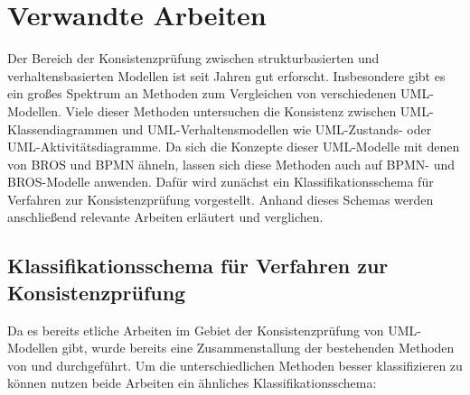 \chapter{Verwandte Arbeiten}

Der Bereich der Konsistenzprüfung zwischen strukturbasierten und verhaltensbasierten Modellen ist seit Jahren gut erforscht.
Insbesondere gibt es ein großes Spektrum an Methoden zum Vergleichen von verschiedenen UML-Modellen.
Viele dieser Methoden untersuchen die Konsistenz zwischen UML-Klassendiagrammen und UML-Verhaltensmodellen wie UML-Zustands- oder UML-Aktivitätsdiagramme.
Da sich die Konzepte dieser UML-Modelle mit denen von BROS und BPMN ähneln, lassen sich diese Methoden auch auf BPMN- und BROS-Modelle anwenden.
Dafür wird zunächst ein Klassifikationsschema für Verfahren zur Konsistenzprüfung vorgestellt.
Anhand dieses Schemas werden anschließend relevante Arbeiten erläutert und verglichen.

\section{Klassifikationsschema für Verfahren zur Konsistenzprüfung}

Da es bereits etliche Arbeiten im Gebiet der Konsistenzprüfung von UML-Modellen gibt, wurde bereits eine Zusammenstallung der bestehenden Methoden von  \cite{Usman2008} und \cite{Lucas2009} durchgeführt.
Um die unterschiedlichen Methoden besser klassifizieren zu können nutzen beide Arbeiten ein ähnliches Klassifikationsschema:

